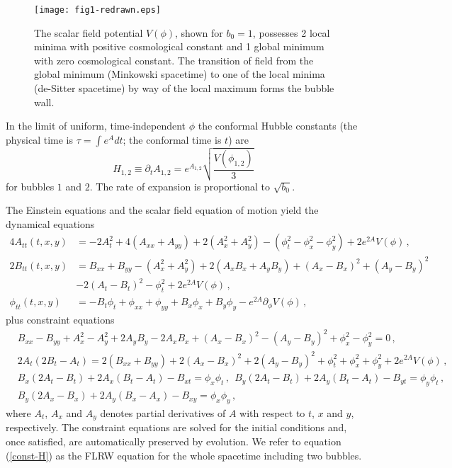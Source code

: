 \documentclass[preprintnumbers,eqsecnum,aps,prd,epsf,showpacs,nofootinbib
]{revtex4}
\begin{document}
\begin{figure}[htbp]
\begin{center}
\texttt{[image: fig1-redrawn.eps]} 
\end{center}
\caption{The scalar field potential $V(\phi)$, shown for
  $b_0=1$, possesses 2 local minima with positive cosmological
  constant and 1 global minimum with zero cosmological constant. The
  transition of field from the global minimum (Minkowski spacetime) to
  one of the local minima (de-Sitter spacetime) by way of the local
  maximum forms the bubble wall.}
\label{fig-BCV}
\end{figure}


In the limit of uniform, time-independent $\phi$ the conformal Hubble
constants (the physical time is $\tau=\int e^{A} dt$; the conformal
time is $t$) are
\begin{equation}
H_{1,2}\equiv \partial_t A_{1,2}=e^{A_{1,2}}\sqrt{\frac{V(\phi_{1,2})}{3}}\,
\label{Hubble-eq}
\end{equation}
for bubbles $1$ and $2$.  The rate of expansion is proportional to
$\sqrt{b_0}$.

The Einstein equations and the scalar field equation of motion yield
the dynamical equations
\begin{align}
4A_{tt}(t,x,y)&=-2A_t^2+4 (A_{xx}+A_{yy})+2(A_x^2+A_y^2)-(\phi_t^2-\phi_x^2-\phi_y^2)+2e^{2A}V(\phi)\,,\label{dyn1}\\
2B_{tt}(t,x,y)&=B_{xx}+B_{yy}-(A_x^2+A_y^2)+2(A_x B_x+A_y B_y)+
(A_x-B_x)^2 +(A_y- B_y)^2\nonumber\\
& -2(A_t-B_t)^2-\phi_t^2+2e^{2A}V(\phi)\,,\label{dyn12}\\
\phi_{tt}(t,x,y)&=-B_t\phi_t+\phi_{xx}+\phi_{yy}+B_x\phi_x +B_y\phi_y-e^{2A}\partial_\phi V(\phi)\,,\label{dyn2}
\end{align}
plus constraint equations
\begin{align}
&B_{xx}-B_{yy}+A_x^2-A_y^2+2A_y B_y-2A_x B_x+
(A_x-B_x)^2-(A_y-B_y)^2+\phi_x^2-\phi_y^2=0\,,\label{const1}\\
&2A_t(2B_t-A_t)=2(B_{xx}+B_{yy})+2(A_x-B_x)^2+2(A_y-B_y)^2+\phi_t^2+
\phi_x^2+\phi_y^2 +2e^{2A}V(\phi)\,,\label{const-H}\\
&B_x(2A_t-B_t)+2A_x(B_t-A_t)-B_{xt}=\phi_x\phi_t\,,~~B_y(2A_t-B_t)+2A_y(B_t-A_t)-B_{yt}=\phi_y\phi_t\,,\label{const2}\\
&B_y(2A_x-B_x)+2A_y(B_x-A_x)-B_{xy}=\phi_x\phi_y\,,\label{const3}
\end{align}
where $A_t$, $A_x$ and $A_y$ denotes partial derivatives of $A$ with respect to
$t$, $x$ and $y$, respectively.  The constraint equations are
solved for the initial conditions and, once satisfied, are
automatically preserved by evolution.  We refer to equation (\ref{const-H})
as the FLRW equation for the whole spacetime including two bubbles.
\end{document}
